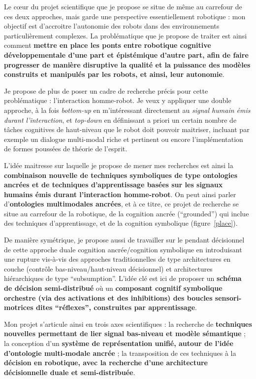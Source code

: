 \documentclass[a4paper]{article}
\begin{document}
Le c\oe ur du projet scientifique que je propose se situe de même au carrefour
de ces deux approches, mais garde une perspective essentiellement robotique :
mon objectif est d'accroitre l'autonomie des robots dans des environnements
particulièrement complexes. La problématique que je propose de traiter est ainsi
comment \textbf{mettre en place les ponts entre robotique cognitive
développementale d'une part et épistémique d'autre part, afin de faire
progresser de manière disruptive la qualité et la puissance des modèles
construits et manipulés par les robots, et ainsi, leur autonomie}.

Je propose de plus de poser un cadre de recherche précis pour cette
problématique : l'interaction homme-robot. Je veux y appliquer une double
approche, à la fois \emph{bottom-up} en m'intéressant directement au
\emph{signal humain émis durant l'interaction}, et \emph{top-down} en
définissant a priori un certain nombre de tâches cognitives de haut-niveau que
le robot doit pouvoir maitriser, incluant par exemple un dialogue multi-modal
riche et pertinent ou encore l'implémentation de formes poussées de théorie de
l'esprit.

L'idée maitresse sur laquelle je propose de mener mes recherches est ainsi la
\textbf{combinaison nouvelle de techniques symboliques de type ontologies
ancrées et de techniques d'apprentissage basées sur les signaux humains émis
durant l'interaction homme-robot}. On peut ainsi parler d'\textbf{ontologies
multimodales ancrées}, et à ce titre, ce projet de recherche se situe
au carrefour de la robotique, de la cognition ancrée (``grounded'') qui inclue
des techniques d'apprentissage, et de la cognition symbolique
(figure~\ref{place}).

De manière symétrique, je propose aussi de travailler sur le pendant décisionnel
de cette approche duale cognition ancrée/cognition symbolique en introduisant
une rupture vis-à-vis des approches traditionnelles de type architectures en
couche (contrôle bas-niveau/haut-niveau décisionnel) et architectures
hiérarchiques de type ``subsumption''. L'idée clé est ici de proposer un
\textbf{schéma de décision semi-distribué} où un \textbf{composant cognitif
symbolique orchestre (via des activations et des inhibitions) des boucles
sensori-motrices dites ``réflexes'', construites par apprentissage}.

Mon projet s'articule ainsi en trois axes scientifiques : la recherche de
\textbf{techniques nouvelles permettant de lier signal bas-niveau et modèle
sémantique} ; la conception d'un \textbf{système de représentation unifié,
autour de l'idée d'ontologie multi-modale ancrée} ; la transposition de ces
techniques à la \textbf{décision en robotique, avec la recherche d'une
architecture décisionnelle duale et semi-distribuée}.
\end{document}
